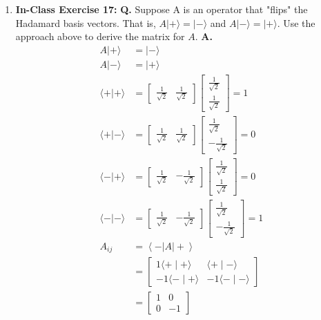 \documentclass[main.tex]{subfiles}
\begin{document}
\begin{enumerate}
\item[] \textbf{In-Class Exercise 17:} \textbf{Q.} Suppose A is an operator that "flips" the Hadamard basis vectors. That is, $A|+\rangle=|-\rangle$ and $A|-\rangle=|+\rangle$. Use the approach above to derive the matrix for $A$. \textbf{A.}
    \begin{align*}
        A|+\rangle          & = |-\rangle \\
        A|-\rangle          & = |+\rangle \\
        \langle+|+\rangle   & = \left[\begin{array}{ll} \frac{1}{\sqrt{2}} & \frac{1}{\sqrt{2}} \end{array}\right]   
                            \left[\begin{array}{c} \frac{1}{\sqrt{2}} \\ \frac{1}{\sqrt{2}} \end{array}\right] = 1\\
        \langle+|-\rangle   & = \left[\begin{array}{ll} \frac{1}{\sqrt{2}} & \frac{1}{\sqrt{2}} \end{array}\right] 
                            \left[\begin{array}{c} \frac{1}{\sqrt{2}} \\ -\frac{1}{\sqrt{2}} \end{array}\right] = 0 \\
        \langle-|+\rangle   & = \left[\begin{array}{ll} \frac{1}{\sqrt{2}} & -\frac{1}{\sqrt{2}} \end{array}\right] 
                            \left[\begin{array}{c} \frac{1}{\sqrt{2}} \\ \frac{1}{\sqrt{2}} \end{array}\right] = 0 \\
        \langle-|-\rangle   & = \left[\begin{array}{ll} \frac{1}{\sqrt{2}} & -\frac{1}{\sqrt{2}} \end{array}\right] 
                            \left[\begin{array}{c} \frac{1}{\sqrt{2}} \\ -\frac{1}{\sqrt{2}} \end{array}\right] = 1 \\
        A_{i j}             & = \left\langle - |A| + \right\rangle\\
                            & = \left[\begin{array}{ll} 1 \langle+\mid+\rangle & \langle+\mid-\rangle \\ 
                            -1 \langle-\mid+\rangle & -1\langle-\mid-\rangle \end{array}\right] \\
                            & = \left[\begin{array}{ll} 1 & 0 \\ 0 & -1 \end{array}\right]
    \end{align*}
    

\end{enumerate}
\end{document}

